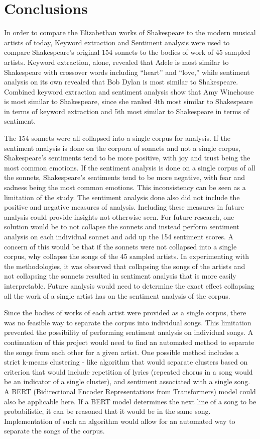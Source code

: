 \documentclass[10pt,a4paper]{article}
\begin{document}
\section{Conclusions}
In order to compare the Elizabethan works of Shakespeare to the modern musical artists of today, Keyword extraction and Sentiment analysis were used to compare Shakespeare’s original 154 sonnets to the bodies of work of 45 sampled artists. Keyword extraction, alone, revealed that Adele is most similar to Shakespeare with crossover words including “heart” and “love,” while sentiment analysis on its own revealed that Bob Dylan is most similar to Shakespeare. Combined keyword extraction and sentiment analysis show that Amy Winehouse is most similar to Shakespeare, since she ranked 4th most similar to Shakespeare in terms of keyword extraction and 5th most similar to Shakespeare in terms of sentiment. 

\noindent The 154 sonnets were all collapsed into a single corpus for analysis. If the sentiment analysis is done on the corpora of sonnets and not a single corpus, Shakespeare’s sentiments tend to be more positive, with joy and trust being the most common emotions. If the sentiment analysis is done on a single corpus of all the sonnets, Shakespeare’s sentiments tend to be more negative, with fear and sadness being the most common emotions. This inconsistency can be seen as a limitation of the study. The sentiment analysis done also did not include the positive and negative measures of analysis. Including these measures in future analysis could provide insights not otherwise seen. For future research, one solution would be to not collapse the sonnets and instead perform sentiment analysis on each individual sonnet and add up the 154 sentiment scores. A concern of this would be that if the sonnets were not collapsed into a single corpus, why collapse the songs of the 45 sampled artists. In experimenting with the methodologies, it was observed that collapsing the songs of the artists and not collapsing the sonnets resulted in sentiment analysis that is more easily interpretable. Future analysis would need to determine the exact effect collapsing all the work of a single artist has on the sentiment analysis of the corpus. 

\noindent Since the bodies of works of each artist were provided as a single corpus, there was no feasible way to separate the corpus into individual songs. This limitation prevented the possibility of performing sentiment analysis on individual songs. A continuation of this project would need to find an automated method to separate the songs from each other for a given artist. One possible method includes a strict k-means clustering - like algorithm that would separate clusters based on criterion that would include repetition of lyrics (repeated chorus in a song would be an indicator of a single cluster), and sentiment associated with a single song. A BERT (Bidirectional Encoder Representations from Transformers) model could also be applicable here. If a BERT model determines the next line of a song to be probabilistic, it can be reasoned that it would be in the same song. Implementation of such an algorithm would allow for an automated way to separate the songs of the corpus.
\end{document}
